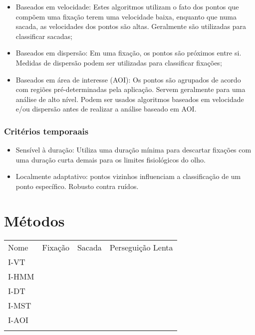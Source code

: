 \documentclass[brazil,]{report}
\begin{document}
\begin{itemize}
\itemsep1pt\parskip0pt
\item
  Baseados em velocidade: Estes algoritmos utilizam o fato dos pontos
  que compõem uma fixação terem uma velocidade baixa, enquanto que numa
  sacada, as velocidades dos pontos são altas. Geralmente são utilizadas
  para classificar sacadas;
\item
  Baseados em dispersão: Em uma fixação, os pontos são próximos entre
  si. Medidas de dispersão podem ser utilizadas para classificar
  fixações;
\item
  Baseados em área de interesse (AOI): Os pontos são agrupados de acordo
  com regiões pré-determinadas pela aplicação. Servem geralmente para
  uma análise de alto nível. Podem ser usados algoritmos baseados em
  velocidade e/ou dispersão antes de realizar a análise baseado em AOI.
\end{itemize}

\subsection{Critérios temporaais}\label{crituxe9rios-temporaais}

\begin{itemize}
\itemsep1pt\parskip0pt
\item
  Sensível à duração: Utiliza uma duração mínima para descartar fixações
  com uma duração curta demais para os limites fisiológicos do olho.
\item
  Localmente adaptativo: pontos vizinhos influenciam a classificação de
  um ponto específico. Robusto contra ruídos.
\end{itemize}

\chapter{Métodos}\label{muxe9todos}

\begin{longtable}[c]{@{}llll@{}}
\hline\noalign{\medskip}
Nome & Fixação & Sacada & Perseguição Lenta
\\\noalign{\medskip}
\hline\noalign{\medskip}
I-VT & & &
\\\noalign{\medskip}
I-HMM & & &
\\\noalign{\medskip}
I-DT & & &
\\\noalign{\medskip}
I-MST & & &
\\\noalign{\medskip}
I-AOI & & &
\\\noalign{\medskip}
\hline
\end{longtable}
\end{document}
